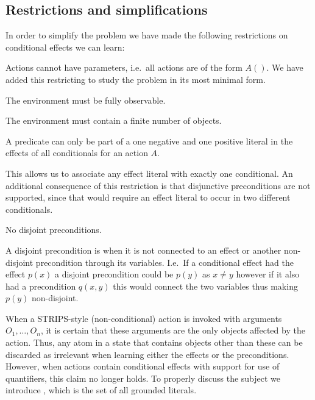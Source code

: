 \documentclass[\master/Master.tex]{subfiles}
\begin{document}
\subsection{Restrictions and simplifications}
In order to simplify the problem we have made the following restrictions on conditional effects we can learn:


\begin{propenum}[label=R.\arabic*]
	\item \label{rst:ca:no-action-params} Actions cannot have parameters, i.e.\ all actions are of the form $A()$. 
	We have added this restricting to study the problem in its most minimal form.	
	\item The environment must be fully observable.
	\item The environment must contain a finite number of objects.
    \item \label{rst:ca:no-disjuntive-conditionals} \label{rst:ca:no-multiple-effect} A predicate can only be part of a one negative and one positive literal in the effects of all conditionals for an action $A$. 
    
    This allows us to associate any effect literal with exactly one conditional. An additional consequence of this restriction is that disjunctive preconditions are not supported, since that would require an effect literal to occur in two different conditionals.

	\item \label{rst:ca:no-disjoint-preconditions} No disjoint preconditions.

		  A disjoint precondition is when it is not connected to an effect or another non-disjoint precondition through its variables.
		  I.e.\ If a conditional effect had the effect $p(x)$ a disjoint precondition could be $p(y)$ as $x \neq y$ however if it also had a precondition $q(x,y)$ this would connect the two variables thus making $p(y)$ non-disjoint.
\end{propenum}

When a STRIPS-style (non-conditional) action is invoked with arguments $O_1, \dots, O_n$, it is certain that these arguments are the only objects affected by the action.
Thus, any atom in a state that contains objects other than these can be discarded as irrelevant when learning either the effects or the preconditions.
However, when actions contain conditional effects with support for use of quantifiers, this claim no longer holds.
To properly discuss the subject we introduce \glits, which is the set of all grounded literals.
\end{document}
